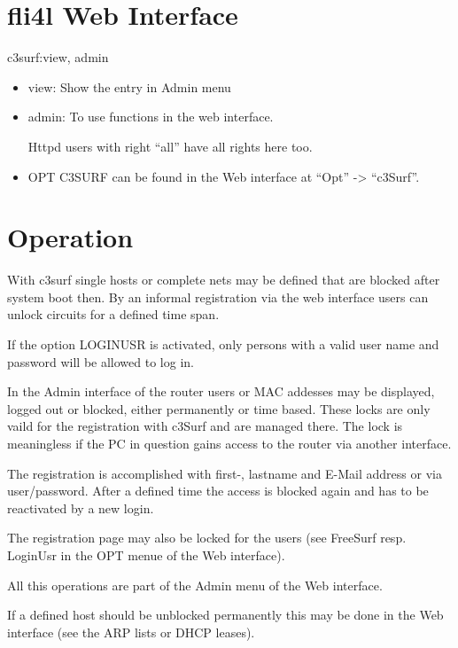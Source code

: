 \section {fli4l Web Interface}

c3surf:view, admin
\begin{itemize}
    \item view: Show the entry in Admin menu
    \item admin: To use functions in the web interface.

    Httpd users with right ``all'' have all rights here too.

    \item OPT C3SURF can be found in the Web interface at ``Opt'' -> ``c3Surf''.
\end{itemize}


\section {Operation}
With c3surf single hosts or complete nets may be defined that are blocked
after system boot then. By an informal registration via the web interface
users can unlock circuits for a defined time span.

\parskip 12pt

If the option LOGINUSR is activated, only persons with a valid user name
and password will be allowed to log in.
\parskip 12pt

In the Admin interface of the router users or MAC addesses may be displayed,
logged out or blocked, either permanently or time based. These locks are only
vaild for the registration with c3Surf and are managed there. The lock is
meaningless if the PC in question gains access to the router via another interface.
\parskip 12pt

The registration is accomplished with first-, lastname and E-Mail address or via
user/password. After a defined time the access is blocked again and has to be
reactivated by a new login.
\parskip 12pt

The registration page may also be locked for the users (see FreeSurf resp.
LoginUsr in the OPT menue of the Web interface).
\parskip 12pt

All this operations are part of the Admin menu of the Web interface.
\parskip 12pt

If a defined host should be unblocked permanently this may be done in
the Web interface (see the ARP lists or DHCP leases).
\parskip 12pt

